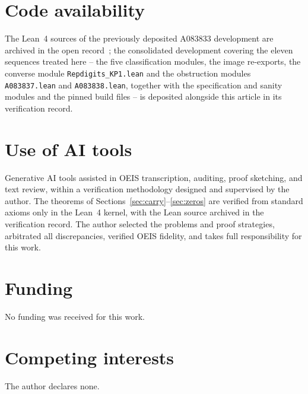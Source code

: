 \documentclass[12pt]{article}
\begin{document}
\section{Code availability}
\label{sec:code}

The Lean~4 sources of the previously deposited A083833
development are archived in the open
record~\cite{artifacts}; the consolidated development
covering the eleven sequences treated here -- the five
classification modules, the image re-exports, the
converse module \texttt{Repdigits\_KP1.lean} and the
obstruction modules \texttt{A083837.lean} and
\texttt{A083838.lean}, together with the specification
and sanity modules and the pinned build files -- is
deposited alongside this article in its verification
record.

\section*{Use of AI tools}
Generative AI tools assisted in OEIS transcription,
auditing, proof sketching, and text review, within a
verification methodology designed and supervised by the
author. The theorems of
Sections~\ref{sec:carry}--\ref{sec:zeros} are verified
from standard axioms only in the Lean~4 kernel, with the
Lean source archived in the verification record. The
author selected the problems and proof strategies,
arbitrated all discrepancies, verified OEIS fidelity,
and takes full responsibility for this work.

\section*{Funding}
No funding was received for this work.

\section*{Competing interests}
The author declares none.
\end{document}

